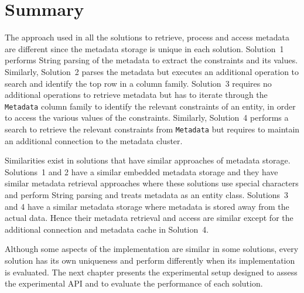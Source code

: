  

  

\section{Summary}\label{s:Implementation-summary}

The approach used in all the solutions to retrieve, process and access metadata
are different since the metadata storage is unique in each solution. Solution~1
performs String parsing of the metadata to extract the constraints and its
values. Similarly, Solution~2 parses the metadata but executes an additional
operation to search and identify the top row in a column family. Solution~3
requires no additional operations to retrieve metadata but  has to iterate
through the \texttt{Metadata} column family to identify the relevant constraints
of an entity, in order to access the various values of the constraints.
Similarly, Solution~4 performs a search to retrieve the relevant constraints
from \texttt{Metadata} but requires to maintain an additional connection to the
metadata cluster. 

Similarities exist in solutions that have similar approaches of metadata
storage. Solutions~1 and 2 have a similar embedded metadata storage and they
have similar metadata retrieval approaches where  these solutions use
special characters and perform String parsing and treats metadata as an entity class. Solutions~3
and 4 have a similar metadata storage where metadata is stored away from the
actual data. Hence their metadata retrieval and access are similar except for
the additional connection and metadata cache in Solution~4.

Although some aspects of the implementation are similar in some solutions,
 every solution has its own uniqueness and perform differently when its
 implementation is evaluated. The next chapter presents the experimental setup
 designed to assess the experimental \ac{API} and to evaluate the performance of
 each solution.

